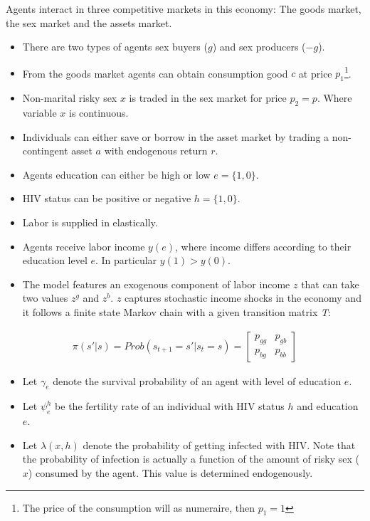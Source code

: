  Agents interact in three competitive markets in this economy: The goods market, the sex market and the assets market.
\begin{itemize}
\item There are two types of agents sex buyers ($g$) and sex producers ($-g$).
\item From the goods market agents can obtain consumption good $c$ at price $p_{1}$\footnote{The price of the consumption will as numeraire, then $p_{1}=1$}.
\item Non-marital risky sex $x$ is traded in the sex market for price $p_{2}=p$. Where variable $x$ is continuous.
\item Individuals can either save or borrow in the asset market by trading a non-contingent asset $a$ with endogenous return $r$.
\item Agents education can either be high or low $e=\{1,0\}$.
\item HIV status can be positive or negative $h=\{1,0\}$.
\item Labor is supplied in elastically.
\item Agents receive labor income $y(e)$, where income differs according to their education level $e$. In particular $y(1)>y(0)$.
\item The model features an exogenous component of labor income $z$ that can take two values $z^{g}$ and $z^{b}$. $z$ captures stochastic income shocks in the economy and it follows a finite state Markov chain with a given transition matrix \textit{T}:
\end{itemize}
\begin{align*}
    \pi(s'|s) = Prob(s_{t+1}=s'|s_{t}=s)=    \begin{bmatrix}%
    p_{gg} & p_{gb}\\
    p_{bg} & p_{bb}
    \end{bmatrix}
\end{align*}
\begin{itemize}
\item Let $\gamma_{e}$ denote the survival probability of an agent with level of education $e$.
\item Let $\psi^{h}_{e}$ be the fertility rate of an individual with HIV status $h$ and education $e$.
\item Let $\lambda(x,h)$ denote the probability of getting infected with HIV. Note that the probability of infection is actually a function of the amount of risky sex ($x$) consumed by the agent. This value is determined endogenously.
\end{itemize}
